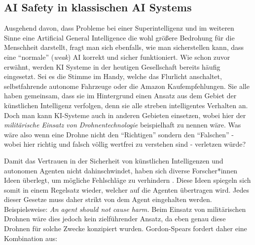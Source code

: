         \subsection{AI Safety in klassischen AI Systems}

        Ausgehend davon, dass Probleme bei einer Superintelligenz und im weiteren Sinne eine Artificial General
        Intelligence die wohl größere Bedrohung für die Menschheit darstellt, fragt man sich ebenfalls, wie man
        sicherstellen kann, dass eine ``normale'' (\textit{weak}) AI korrekt und sicher funktioniert. Wie schon
        zuvor erwähnt, werden KI Systeme in der heutigen Gesellschaft bereits häufig eingesetzt. Sei es die
        Stimme im Handy, welche das Flurlicht anschaltet, selbstfahrende autonome Fahrzeuge oder die Amazon
        Kaufempfehlungen. Sie alle haben gemeinsam, dass sie im Hintergrund einen Ansatz aus dem Gebiet der künstlichen
        Intelligenz verfolgen, denn sie alle streben intelligentes Verhalten an. Doch man kann KI-Systeme auch in
        anderen Gebieten einsetzen, wobei hier der \textit{militärische Einsatz von Drohnentechnologie} beispielhaft
        zu nennen wäre. \cite[s. 251]{Stulpe2018} Was wäre also wenn eine Drohne nicht den ``Richtigen'' sondern den
        ``Falschen'' - wobei hier richtig und falsch völlig wertfrei zu verstehen sind - verletzen würde?

        Damit das Vertrauen in der Sicherheit von künstlichen Intelligenzen und autonomen Agenten nicht dahinschwindet,
        haben sich diverse Forscher*innen Ideen überlegt, um mögliche Fehlschläge zu verhindern \cite[s. 257]{GordonSpears2003}.
        Diese Ideen spiegeln sich somit in einem Regelsatz wieder, welcher auf die Agenten übertragen wird. Jedes dieser
        Gesetze muss daher strikt von dem Agent eingehalten werden. Beispielsweise:
        \textit{An agent should not cause harm.} Beim Einsatz von militärischen Drohnen wäre dies jedoch kein
        zielführender Ansatz, da eben genau diese Drohnen für solche Zwecke konzipiert wurden. Gordon-Spears fordert daher
        eine Kombination aus:

